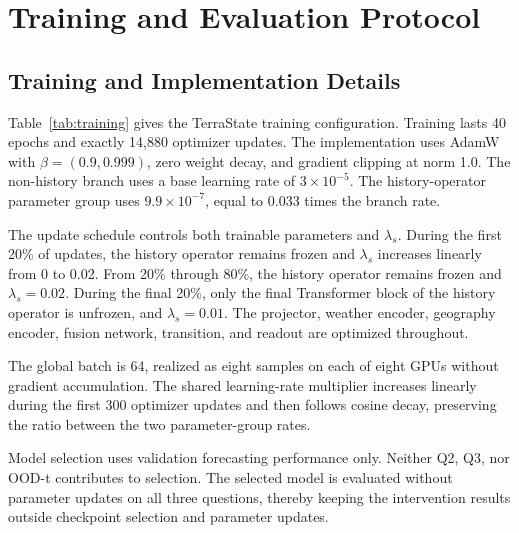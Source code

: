 \documentclass[letterpaper]{article}
\begin{document}
\section{Training and Evaluation Protocol}
\label{sec:training-evaluation}

\subsection{Training and Implementation Details}

Table~\ref{tab:training} gives the TerraState training configuration. Training
lasts 40 epochs and exactly 14,880 optimizer updates. The implementation uses
AdamW with \(\beta=(0.9,0.999)\), zero weight decay, and gradient clipping at
norm 1.0. The non-history branch uses a base learning rate of
\(3\times10^{-5}\). The history-operator parameter group uses
\(9.9\times10^{-7}\), equal to 0.033 times the branch rate.

The update schedule controls both trainable parameters and
\(\lambda_s\). During the first 20\% of updates, the history operator remains
frozen and \(\lambda_s\) increases linearly from 0 to 0.02. From 20\% through
80\%, the history operator remains frozen and \(\lambda_s=0.02\). During the
final 20\%, only the final Transformer block of the history operator is
unfrozen, and \(\lambda_s=0.01\). The projector, weather encoder, geography
encoder, fusion network, transition, and readout are optimized throughout.

The global batch is 64, realized as eight samples on each of eight GPUs
without gradient accumulation. The shared learning-rate multiplier increases
linearly during the first 300 optimizer updates and then follows cosine decay,
preserving the ratio between the two parameter-group rates.

Model selection uses validation forecasting performance only. Neither Q2,
Q3, nor OOD-t contributes to selection. The selected model is evaluated
without parameter updates on all three questions, thereby keeping the
intervention results outside checkpoint selection and parameter updates.
\end{document}
